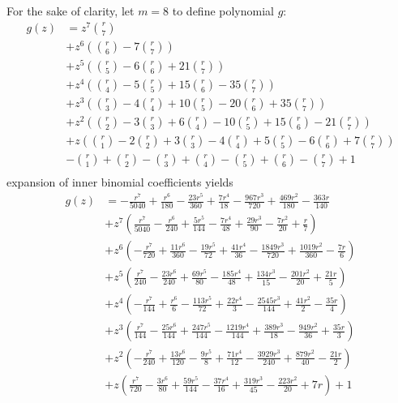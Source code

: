 For the sake of clarity, let $m=8$ to define polynomial $g$:
\begin{displaymath}
\begin{split}
g{\left (z \right )} &= z^{7} {\binom{r}{7}} \\
&+ z^{6} \left({\binom{r}{6}} - 7 {\binom{r}{7}}\right) \\
&+ z^{5} \left({\binom{r}{5}} - 6 {\binom{r}{6}} + 21 {\binom{r}{7}}\right) \\
&+ z^{4} \left({\binom{r}{4}} - 5 {\binom{r}{5}} + 15 {\binom{r}{6}} - 35 {\binom{r}{7}}\right) \\
&+ z^{3} \left({\binom{r}{3}} - 4 {\binom{r}{4}} + 10 {\binom{r}{5}} - 20 {\binom{r}{6}} + 35 {\binom{r}{7}}\right) \\
&+ z^{2} \left({\binom{r}{2}} - 3 {\binom{r}{3}} + 6 {\binom{r}{4}} - 10 {\binom{r}{5}} + 15 {\binom{r}{6}} - 21 {\binom{r}{7}}\right) \\
&+ z \left({\binom{r}{1}} - 2 {\binom{r}{2}} + 3 {\binom{r}{3}} - 4 {\binom{r}{4}} + 5 {\binom{r}{5}} - 6 {\binom{r}{6}} + 7 {\binom{r}{7}}\right) \\
&- {\binom{r}{1}} + {\binom{r}{2}} - {\binom{r}{3}} + {\binom{r}{4}} - {\binom{r}{5}} + {\binom{r}{6}} - {\binom{r}{7}} + 1 \\
\end{split}
\end{displaymath}
expansion of inner binomial coefficients yields
\begin{displaymath}
\begin{split}
g{\left (z \right )} &= - \frac{r^{7}}{5040} + \frac{r^{6}}{180} - \frac{23 r^{5}}{360} + \frac{7 r^{4}}{18} - \frac{967 r^{3}}{720} + \frac{469 r^{2}}{180} - \frac{363 r}{140} \\
&+ z^{7} \left(\frac{r^{7}}{5040} - \frac{r^{6}}{240} + \frac{5 r^{5}}{144} - \frac{7 r^{4}}{48} + \frac{29 r^{3}}{90} - \frac{7 r^{2}}{20} + \frac{r}{7}\right) \\
&+ z^{6} \left(- \frac{r^{7}}{720} + \frac{11 r^{6}}{360} - \frac{19 r^{5}}{72} + \frac{41 r^{4}}{36} - \frac{1849 r^{3}}{720} + \frac{1019 r^{2}}{360} - \frac{7 r}{6}\right) \\
&+ z^{5} \left(\frac{r^{7}}{240} - \frac{23 r^{6}}{240} + \frac{69 r^{5}}{80} - \frac{185 r^{4}}{48} + \frac{134 r^{3}}{15} - \frac{201 r^{2}}{20} + \frac{21 r}{5}\right) \\
&+ z^{4} \left(- \frac{r^{7}}{144} + \frac{r^{6}}{6} - \frac{113 r^{5}}{72} + \frac{22 r^{4}}{3} - \frac{2545 r^{3}}{144} + \frac{41 r^{2}}{2} - \frac{35 r}{4}\right) \\
&+ z^{3} \left(\frac{r^{7}}{144} - \frac{25 r^{6}}{144} + \frac{247 r^{5}}{144} - \frac{1219 r^{4}}{144} + \frac{389 r^{3}}{18} - \frac{949 r^{2}}{36} + \frac{35 r}{3}\right) \\
&+ z^{2} \left(- \frac{r^{7}}{240} + \frac{13 r^{6}}{120} - \frac{9 r^{5}}{8} + \frac{71 r^{4}}{12} - \frac{3929 r^{3}}{240} + \frac{879 r^{2}}{40} - \frac{21 r}{2}\right) \\
&+ z \left(\frac{r^{7}}{720} - \frac{3 r^{6}}{80} + \frac{59 r^{5}}{144} - \frac{37 r^{4}}{16} + \frac{319 r^{3}}{45} - \frac{223 r^{2}}{20} + 7 r\right) + 1
\end{split}
\end{displaymath}
